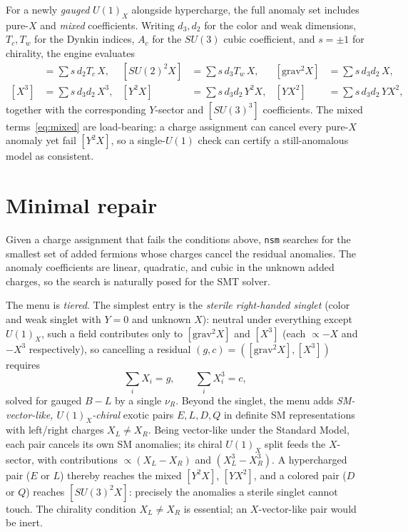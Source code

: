 \documentclass[11pt]{article}
\newcommand{\nsm}{\texttt{nsm}}
\newcommand{\UX}{U(1)_X}
\newcommand{\SUthree}{SU(3)}
\newcommand{\SUtwo}{SU(2)}
\begin{document}
For a newly \emph{gauged} $\UX$ alongside hypercharge, the full anomaly set
includes pure-$X$ and \emph{mixed} coefficients. Writing $d_3,d_2$ for the color
and weak dimensions, $T_c,T_w$ for the Dynkin indices, $A_c$ for the $\SUthree$
cubic coefficient, and $s=\pm1$ for chirality, the engine evaluates
\begin{align}
[\SUthree^2 X] &= \textstyle\sum s\,d_2 T_c\,X, &
[\SUtwo^2 X] &= \textstyle\sum s\,d_3 T_w\,X, &
[\text{grav}^2 X] &= \textstyle\sum s\,d_3 d_2\,X, \nonumber\\
[X^3] &= \textstyle\sum s\,d_3 d_2\,X^3, &
[Y^2 X] &= \textstyle\sum s\,d_3 d_2\,Y^2 X, &
[Y X^2] &= \textstyle\sum s\,d_3 d_2\,Y X^2,
\label{eq:mixed}
\end{align}
together with the corresponding $Y$-sector and $[\SUthree^3]$ coefficients. The
mixed terms~\eqref{eq:mixed} are load-bearing: a charge assignment can cancel
every pure-$X$ anomaly yet fail $[Y^2 X]$, so a single-$U(1)$ check can certify
a still-anomalous model as consistent.

\section{Minimal repair}

Given a charge assignment that fails the conditions above, \nsm{} searches for
the smallest set of added fermions whose charges cancel the residual anomalies.
The anomaly coefficients are linear, quadratic, and cubic in the unknown added
charges, so the search is naturally posed for the SMT solver.

The menu is \emph{tiered}. The simplest entry is the \emph{sterile right-handed
singlet} (color and weak singlet with $Y=0$ and unknown $X$): neutral under
everything except $\UX$, such a field contributes only to $[\text{grav}^2 X]$
and $[X^3]$ (each $\propto -X$ and $-X^3$ respectively), so cancelling a residual
$(g,c)=([\text{grav}^2 X],[X^3])$ requires
\begin{equation}
\sum_i X_i = g, \qquad \sum_i X_i^3 = c,
\label{eq:repair}
\end{equation}
solved for gauged $B\!-\!L$ by a single $\nu_R$. Beyond the singlet, the menu
adds \emph{SM-vector-like, $\UX$-chiral} exotic pairs $E,L,D,Q$ in definite SM
representations with left/right charges $X_L\neq X_R$. Being vector-like under
the Standard Model, each pair cancels its own SM anomalies; its chiral $\UX$
split feeds the $X$-sector, with contributions $\propto(X_L-X_R)$ and
$(X_L^3-X_R^3)$. A hypercharged pair ($E$ or $L$) thereby reaches the mixed
$[Y^2X]$, $[YX^2]$, and a colored pair ($D$ or $Q$) reaches $[\SUthree^2 X]$:
precisely the anomalies a sterile singlet cannot touch. The chirality condition
$X_L\neq X_R$ is essential; an $X$-vector-like pair would be inert.
\end{document}
